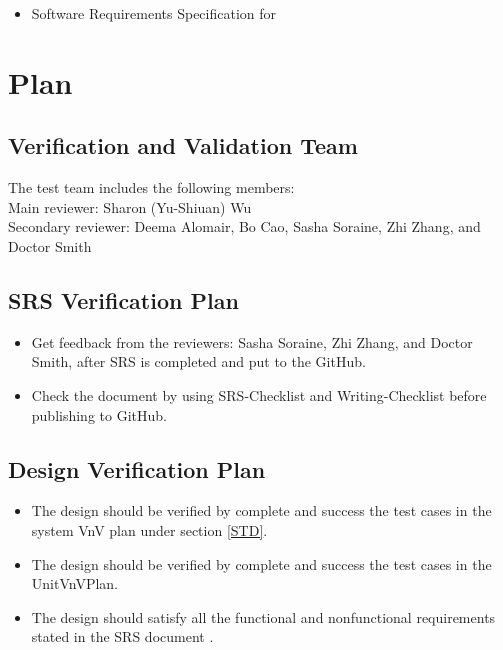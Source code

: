 \documentclass[12pt, titlepage]{article}
\begin{document}
\begin{itemize} 
\item Software Requirements Specification for \progname [Wu~\cite{YS2019}] 
 \end{itemize} 

 \section{Plan}	
\subsection{Verification and Validation Team} The test team includes the
following members:\\ 
Main reviewer: Sharon (Yu-Shiuan) Wu\\ 
Secondary reviewer: Deema Alomair, Bo Cao, Sasha Soraine, Zhi Zhang, 
and Doctor Smith\\
\subsection{SRS Verification Plan}

\begin{itemize}

\item Get feedback from the reviewers: Sasha Soraine, Zhi Zhang, and Doctor
Smith, after SRS is completed and put to the GitHub.
\item Check the document by using SRS-Checklist and Writing-Checklist before
publishing to GitHub.

\end{itemize}


\subsection{Design Verification Plan}\label{Planfordv}
\begin{itemize}

\item The design should be verified by complete and success the test cases in
the system VnV plan under section \ref{STD}.
\item The design should be verified by complete and success the test cases in the UnitVnVPlan. 
\item The design should satisfy all the functional and nonfunctional requirements stated in the SRS document \cite{YS2019}.

\end{itemize}
\end{document}
